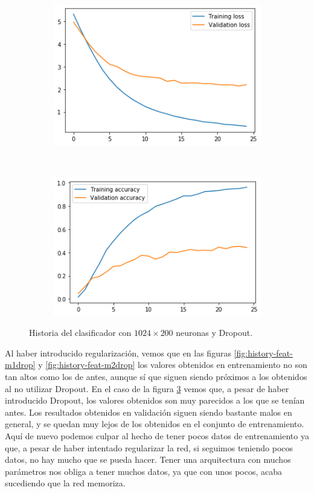 \documentclass[11pt,a4paper]{article}
\begin{document}
\begin{figure}[H]
  \centering
  \begin{subfigure}{.5\textwidth}
    \centering
    \includegraphics[scale=0.4]{img/feat-m3drop-loss.png}
    \label{fig:feat-m3drop-loss}
  \end{subfigure}%
  ~ \quad
  \begin{subfigure}{.5\textwidth}
    \centering
    \includegraphics[scale=0.4]{img/feat-m3drop-acc.png}
    \label{fig:feat-m3drop-acc}
  \end{subfigure}
  \caption{Historia del clasificador con $1024 \times 200$ neuronas y Dropout.}
  \label{fig:history-feat-m3drop}
\end{figure}

Al haber introducido regularización, vemos que en las figuras \ref{fig:history-feat-m1drop} y
\ref{fig:history-feat-m2drop} los valores obtenidos en entrenamiento no son tan altos como
los de antes, aunque sí que siguen siendo próximos a los obtenidos al no utilizar Dropout.
En el caso de la figura \ref{fig:history-feat-m3drop} vemos que, a pesar de haber introducido
Dropout, los valores obtenidos son muy parecidos a los que se tenían antes. Los resultados
obtenidos en validación siguen siendo bastante malos en general, y se quedan muy lejos de los
obtenidos en el conjunto de entrenamiento. Aquí de nuevo podemos culpar al hecho de tener
pocos datos de entrenamiento ya que, a pesar de haber intentado regularizar la red, si seguimos
teniendo pocos datos, no hay mucho que se pueda hacer. Tener una arquitectura con muchos
parámetros nos obliga a tener muchos datos, ya que con unos pocos, acaba sucediendo que
la red memoriza.
\end{document}
